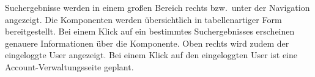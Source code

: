 Suchergebnisse werden in einem großen Bereich rechts bzw.\ unter der Navigation angezeigt. 
Die Komponenten werden übersichtlich in tabellenartiger Form bereitgestellt. Bei einem Klick auf ein bestimmtes Suchergebnisses erscheinen genauere Informationen über die Komponente. 
Oben rechts wird zudem der eingeloggte User angezeigt.
Bei einem Klick auf den eingeloggten User ist eine Account-Verwaltungsseite geplant.

